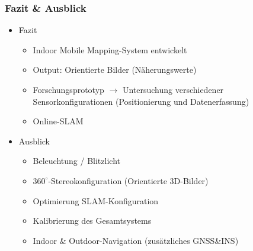 \documentclass[aspectratio=169]{beamer}
\begin{document}
\begin{frame}
\frametitle{Fazit \& Ausblick}
  \begin{itemize}
   \item Fazit
   \begin{itemize}
    \item Indoor Mobile Mapping-System entwickelt
    \item Output: Orientierte Bilder (Näherungswerte)
    \item Forschungsprototyp $\rightarrow$ Untersuchung verschiedener Sensorkonfigurationen (Positionierung und Datenerfassung)
    \item Online-SLAM
   \end{itemize}
   \pause
   \item Ausblick
   \begin{itemize}
    \item Beleuchtung / Blitzlicht
    \item $360^\circ$-Stereokonfiguration (Orientierte 3D-Bilder)
    \item Optimierung SLAM-Konfiguration
    \item Kalibrierung des Gesamtsystems
    \item Indoor \& Outdoor-Navigation (zusätzliches GNSS\&INS)
   \end{itemize}
  \end{itemize}
\end{frame}
\end{document}
